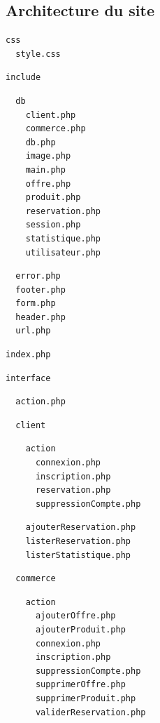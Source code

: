 \documentclass{beamer}
\begin{document}
\subsection{Architecture du site}

\begin{frame}[fragile]
	\begin{multicols}{3}
		\tiny{
\color{blue}
		\begin{Verbatim}
css
  style.css
		\end{Verbatim}
\color{blue}
		\begin{Verbatim}
include
		\end{Verbatim}
\color{violet}
		\begin{Verbatim}
  db
    client.php
    commerce.php
    db.php
    image.php
    main.php
    offre.php
    produit.php
    reservation.php
    session.php
    statistique.php
    utilisateur.php
		\end{Verbatim}
\color{blue}
		\begin{Verbatim}
  error.php
  footer.php
  form.php
  header.php
  url.php
		\end{Verbatim}
\color{red}
		\begin{Verbatim}
index.php
		\end{Verbatim}
\color{black}
		\begin{Verbatim}
interface
		\end{Verbatim}
\color{red}
		\begin{Verbatim}
  action.php
		\end{Verbatim}
\color{blue}
		\begin{Verbatim}
  client
		\end{Verbatim}
\color{forestgreen}
		\begin{Verbatim}
    action
      connexion.php
      inscription.php
      reservation.php
      suppressionCompte.php
    		\end{Verbatim}
\color{frenchblue}
		\begin{Verbatim}
    ajouterReservation.php
    listerReservation.php
    listerStatistique.php
		\end{Verbatim}
\color{blue}
		\begin{Verbatim}
  commerce
		\end{Verbatim}
\color{forestgreen}
		\begin{Verbatim}
    action
      ajouterOffre.php
      ajouterProduit.php
      connexion.php
      inscription.php
      suppressionCompte.php
      supprimerOffre.php
      supprimerProduit.php
      validerReservation.php
    		\end{Verbatim}
}
\end{multicols}
\end{frame}
\end{document}
